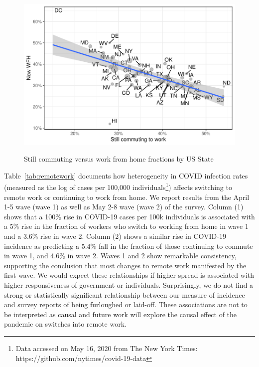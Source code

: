 \documentclass[12pt]{article}
\begin{document}
\begin{figure}
  \caption{Still commuting versus work from home fractions by US State} \label{fig:commute_vs_wfh}
\centering
\begin{minipage}{0.8 \linewidth}
  \includegraphics[width = \linewidth]{plots/commute_vs_wfh.pdf} \\
  \begin{footnotesize}
    \end{footnotesize}
\end{minipage}
\end{figure} 

Table~\ref{tab:remotework} documents how heterogeneity in COVID infection rates (measured as the log of cases per 100,000 individuals\footnote{Data accessed on May 16, 2020 from The New York Times: https://github.com/nytimes/covid-19-data}) affects switching to remote work or continuing to work from home. We report results from the April 1-5 wave (wave 1) as well as May 2-8 wave (wave 2) of the survey. Column (1) shows that a 100\% rise in COVID-19 cases per 100k individuals is associated with a 5\% rise in the fraction of workers who switch to working from home in wave 1 and a 3.6\% rise in wave 2. Column (2) shows a similar rise in COVID-19 incidence as predicting a 5.4\% fall in the fraction of those continuing to commute in wave 1, and 4.6\% in wave 2. Waves 1 and 2 show remarkable consistency, supporting the conclusion that most changes to remote work manifested by the first wave. We would expect these relationships if higher spread is associated with higher responsiveness of government or individuals. Surprisingly, we do not find a strong or statistically significant relationship between our measure of incidence and survey reports of being furloughed or laid-off. These associations are not to be interpreted as causal and future work will explore the causal effect of the pandemic on switches into remote work.
\end{document}
